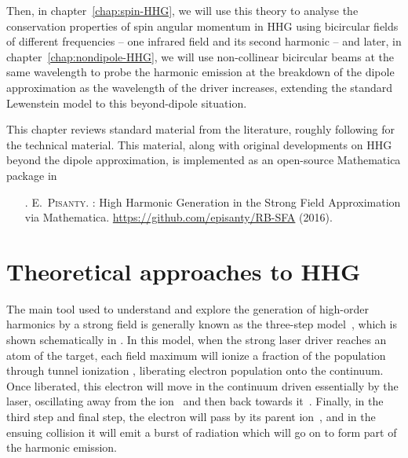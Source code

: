 Then, in chapter~\ref{chap:spin-HHG}, we will use this theory to analyse the conservation properties of spin angular momentum in HHG using bicircular fields of different frequencies -- one infrared field and its second harmonic -- and later, in chapter~\ref{chap:nondipole-HHG}, we will use non-collinear bicircular beams at the same wavelength to probe the harmonic emission at the breakdown of the dipole approximation as the wavelength of the driver increases, extending the standard Lewenstein model to this beyond-dipole situation.



This chapter reviews standard material from the literature, roughly following  for the technical material. This material, along with original developments on HHG beyond the dipole approximation, is implemented as an open-source Mathematica package in
\begin{enumerate}
\item[{\hypersetup{citecolor=black}\citealp{RB-SFA}}.]
\textsc{E.~Pisanty}.
: {H}igh {H}armonic {G}eneration in the {S}trong {F}ield
  {A}pproximation via {M}athematica.
\newblock \url{https://github.com/episanty/RB-SFA} (2016).
\end{enumerate}







\section{Theoretical approaches to HHG}
\label{sec:hhg-intro-intro}


The main tool used to understand and explore the generation of high-order harmonics by a strong field is generally known as the three-step model~\cite{corkum_plasma-perspective_1993, LewensteinHHG}, which is shown schematically in . In this model, when the strong laser driver reaches an atom of the target, each field maximum will ionize a fraction of the population through tunnel ionization , liberating electron population onto the continuum. Once liberated, this electron will move in the continuum driven essentially by the laser, oscillating away from the ion~ and then back towards it~. Finally, in the third step and final step, the electron will pass by its parent ion~, and in the ensuing collision it will emit a burst of radiation which will go on to form part of the harmonic emission.




